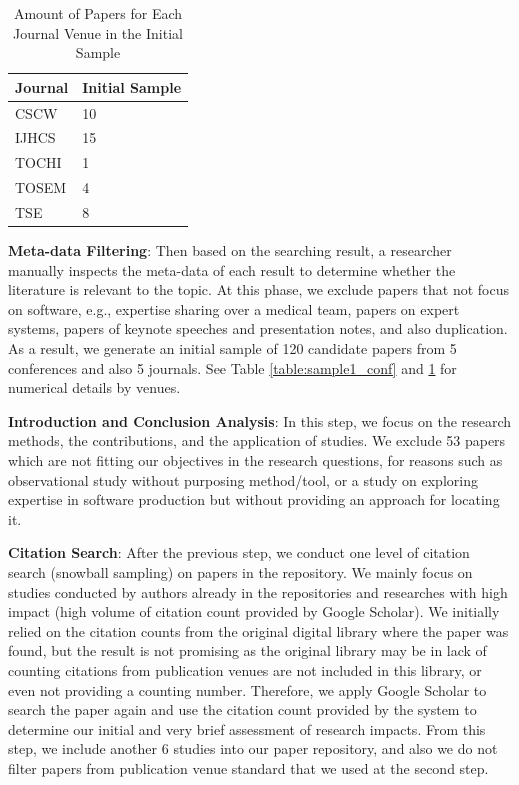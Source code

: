 \begin{table}[tbp]
\centering
\begin{tabular}{ll}
\hline
\textbf{Journal} & \textbf{Initial Sample} \\ \hline
CSCW       & 10             \\ 
IJHCS       & 15             \\ 
TOCHI        & 1             \\ 
TOSEM        & 4             \\ 
TSE        & 8              \\ \hline
\end{tabular}
\caption{Amount of Papers for Each Journal Venue in the Initial Sample}
\label{table:sample1_jour}
\end{table}

\textbf{Meta-data Filtering}: Then based on the searching result, a researcher manually inspects the meta-data of each result to determine whether the literature is relevant to the topic. At this phase, we exclude papers that not focus on software, e.g., expertise sharing over a medical team, papers on expert systems, papers of keynote speeches and presentation notes, and also duplication. As a result, we generate an initial sample of 120 candidate papers from 5 conferences and also 5 journals. See Table \ref{table:sample1_conf} and \ref{table:sample1_jour} for numerical details by venues.

\textbf{Introduction and Conclusion Analysis}: In this step, we focus on the research methods, the contributions, and the application of studies. We exclude 53 papers which are not fitting our objectives in the research questions, for reasons such as observational study without purposing method/tool, or a study on exploring expertise in software production but without providing an approach for locating it.

\textbf{Citation Search}: After the previous step, we conduct one level of citation search (snowball sampling) on papers in the repository. We mainly focus on studies conducted by authors already in the repositories and researches with high impact (high volume of citation count provided by Google Scholar). We initially relied on the citation counts from the original digital library where the paper was found, but the result is not promising as the original library may be in lack of counting citations from publication venues are not included in this library, or even not providing a counting number. Therefore, we apply Google Scholar to search the paper again and use the citation count provided by the system to determine our initial and very brief assessment of research impacts. From this step, we include another 6 studies into our paper repository, and also we do not filter papers from publication venue standard that we used at the second step.

